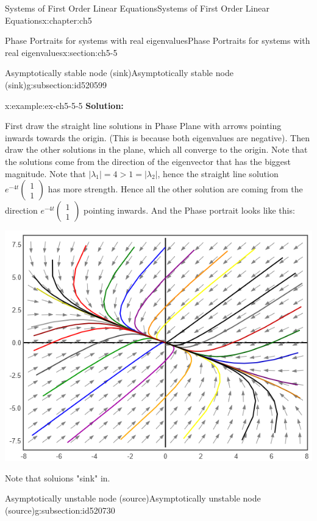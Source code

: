 \documentclass[oneside,10pt,]{book}
\newcommand{\terminology}[1]{\textbf{#1}}
\numberwithin{equation}{section}
\numberwithin{equation}{section}
\begin{document}
\begin{chapterptx}{Systems of First Order Linear Equations}{}{Systems of First Order Linear Equations}{}{}{x:chapter:ch5}
\begin{sectionptx}{Phase Portraits for systems with real eigenvalues}{}{Phase Portraits for systems with real eigenvalues}{}{}{x:section:ch5-5}
\begin{subsectionptx}{Asymptotically stable node (sink)}{}{Asymptotically stable node (sink)}{}{}{g:subsection:id520599}
\begin{example}{}{x:example:ex-ch5-5-5}
\terminology{Solution:}%
\par
First draw the straight line solutions in Phase Plane with arrows pointing inwards towards the origin. (This is because both eigenvalues are negative). Then draw the other solutions in the plane, which all converge to the origin. Note that the solutions come from the direction of the eigenvector that has the biggest magnitude. Note that \(\left|\lambda_{1}\right|=4>1=\left|\lambda_{2}\right|\), hence the straight line solution \(e^{-4t}\left(\begin{array}{c}
1\\
1
\end{array}\right)\) has more strength. Hence all the other solution are coming from the direction \(e^{-4t}\left(\begin{array}{c}
1\\
1
\end{array}\right)\) pointing inwards.  And the Phase portrait looks like this: \begin{image}{0}{1}{0}%
\includegraphics[width=\linewidth]{images/Ex5-5-5.png}
\end{image}%
 Note that soluions "sink" in.%
\end{example}
\end{subsectionptx}
%
%
\typeout{************************************************}
\typeout{************************************************}
%
\begin{subsectionptx}{Asymptotically unstable node (source)}{}{Asymptotically unstable node (source)}{}{}{g:subsection:id520730}

\end{subsectionptx}
\end{sectionptx}
\end{chapterptx}
\end{document}
